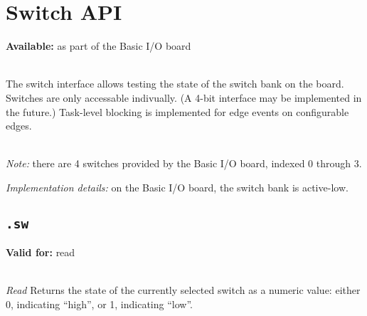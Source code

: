 \documentclass{article}
\begin{document}
%
%
%
%
%
%
%
%
%
%
%
\section{Switch API}
\textbf{Available:} as part of the Basic I/O board

~\\
The switch interface allows testing the state of the switch bank on the board. Switches are only accessable indivually. (A 4-bit interface may be implemented in the future.)
Task-level blocking is implemented for edge events on configurable edges.

~\\
\textit{Note:} there are 4 switches provided by the Basic I/O board, indexed 0 through 3.

\textit{Implementation details:} on the Basic I/O board, the switch bank is active-low.

\subsection{\texttt{.sw}}
\textbf{Valid for:} read

~\\
\textit{Read}
Returns the state of the currently selected switch as a numeric value: either 0, indicating ``high'', or 1, indicating ``low''.
\end{document}
